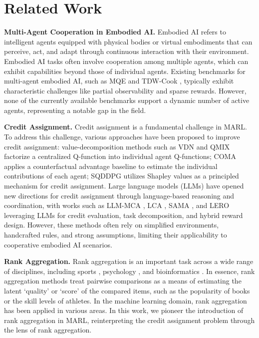\documentclass[11pt]{article}
\begin{document}
%


\section{Related Work}
\label{sec:related_work}

\noindent \textbf{Multi-Agent Cooperation in Embodied AI.} Embodied AI \cite{brooks1991new} refers to intelligent agents equipped with physical bodies or virtual embodiments that can perceive, act, and adapt through continuous interaction with their environment. Embodied AI tasks often involve cooperation among multiple agents, which can exhibit capabilities beyond those of individual agents. Existing benchmarks for multi-agent embodied AI, such as MQE \cite{xiong2024mqe} and TDW-Cook \cite{zhang2024combo}, typically exhibit characteristic challenges like partial observability and sparse rewards. However, none of the currently available benchmarks support a dynamic number of active agents, representing a notable gap in the field. 

%

%

%

%

\noindent \textbf{Credit Assignment.} Credit assignment is a fundamental challenge in MARL. To address this challenge, various approaches have been proposed to improve credit assignment: value-decomposition methods such as VDN \cite{sunehag2017value} and QMIX \cite{rashid2020monotonic} factorize a centralized Q-function into individual agent Q-functions; COMA \cite{foerster2017counterfactual} applies a counterfactual advantage baseline to estimate the individual contributions of each agent; SQDDPG \cite{wang2020shapley} utilizes Shapley values as a principled mechanism for credit assignment. Large language models (LLMs) have opened new directions for credit assignment through language-based reasoning and coordination, with works such as LLM-MCA \cite{nagpal2025leveraging}, LCA \cite{lin2025speaking}, SAMA \cite{li2025multi}, and LERO \cite{wei2025lero} leveraging LLMs for credit evaluation, task decomposition, and hybrid reward design. However, these methods often rely on simplified environments, handcrafted rules, and strong assumptions, limiting their applicability to cooperative embodied AI scenarios.

%

%

%

%

\noindent \textbf{Rank Aggregation.} Rank aggregation is an important task across a wide range of disciplines, including sports \cite{herbrich2006trueskill}, psychology \cite{critchlow1991probability}, and bioinformatics \cite{kolde2012robust}. In essence, rank aggregation methods treat pairwise comparisons as a means of estimating the latent ‘quality’ or ‘score’ of the compared items, such as the popularity of books or the skill levels of athletes. In the machine learning domain, rank aggregation has been applied in various areas. In this work, we pioneer the introduction of rank aggregation in MARL, reinterpreting the credit assignment problem through the lens of rank aggregation.
\end{document}
